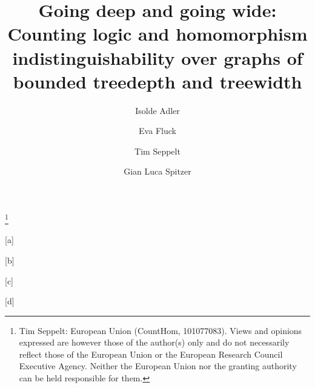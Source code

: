 \documentclass{lmcs}
\theoremstyle{plain}\newtheorem{claim}[thm]{Claim}   %
\begin{document}
	
\title[Going deep and going wide]{Going deep and going wide: Counting logic and homomorphism indistinguishability over graphs of bounded treedepth and treewidth}
\thanks{Tim Seppelt: European Union (CountHom, 101077083). Views and opinions expressed are however those of the author(s) only and do not necessarily reflect those of the European Union or the European Research Council Executive Agency. Neither the European Union nor the granting authority can be held responsible for them.}
\author[I.~Adler]{Isolde Adler }[a]
\author[E.~Fluck]{Eva Fluck }[b]
\author[T.~Seppelt]{Tim Seppelt }[c]
\author[G.~L.~Spitzer]{Gian Luca Spitzer }[d]

\address{University of Bamberg, Germany}
\address{RWTH Aachen University, Germany}
\address{IT-Universitetet i København, Denmark}
\address{Université de Bordeaux, France}
\end{document}
